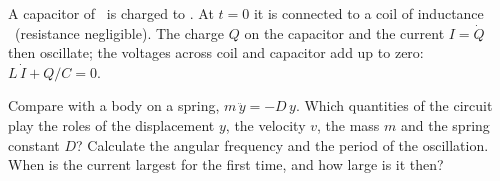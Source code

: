 A capacitor of \CpO\ is charged to \UzO. At $t = 0$ it is connected to a coil of inductance \LiO\ (resistance negligible). The charge $Q$ on the capacitor and the current $I = \dot Q$ then oscillate; the voltages across coil and capacitor add up to zero: $L\,\dot I + Q/C = 0$.
\begin{abcliste}
\abc Compare with a body on a spring, $m\,\ddot y = -D\,y$. Which quantities of the circuit play the roles of the displacement $y$, the velocity $v$, the mass $m$ and the spring constant $D$?
\abc Calculate the angular frequency and the period of the oscillation.
\abc When is the current largest for the first time, and how large is it then?
\end{abcliste}
